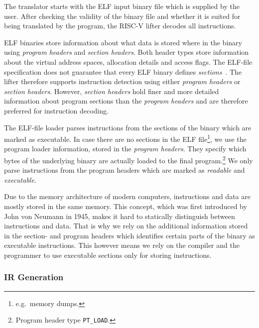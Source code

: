\documentclass[course=eragp]{aspdoc}
\begin{document}
The translator starts with the ELF input binary file which is supplied by the user. After checking the
validity of the binary file and whether it is suited for being translated by the program, the
RISC-V lifter decodes all instructions.

\par

ELF binaries store information about what data is stored where in the binary using \textit{program
    headers} and \textit{section headers}. Both header types store information about the virtual address
spaces, allocation details and access flags. The ELF-file specification does not guarantee that every ELF
binary defines \textit{sections}~\cite{elf_spec}. The lifter therefore supports instruction
detection using either \textit{program headers} or \textit{section headers}. However,
\textit{section headers} hold finer and more detailed information
about program sections than the \textit{program headers} and are therefore preferred for instruction
decoding.

\par

The ELF-file loader parses instructions from the sections of the binary
which are marked as executable. In case there are no sections in the ELF file\footnote{e.g.\ memory dumps.}, we use the
program loader information, stored in the \emph{program headers}. They
specify which bytes of the underlying binary are actually loaded to the final program.\footnote{Program header type \texttt{PT\_LOAD}.}
We only parse instructions from the program headers which are marked as \emph{readable} and
\emph{executable}.

\par

Due to the memory architecture of modern computers, instructions and data are mostly stored in the same
memory. This concept, which was first introduced by John von Neumann in 1945\cite{vna}, makes it
hard to statically distinguish between instructions and data. That is why we rely on the additional
information stored in the section- and program headers which identifies certain parts of the binary
as executable instructions. This however means we rely on the compiler and the programmer to use
executable sections only for storing instructions.

\subsubsection{IR Generation}
\end{document}
